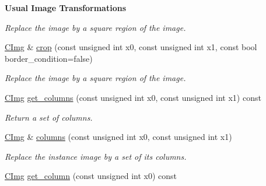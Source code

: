 \begin{Indent}{\bf Usual Image Transformations}
\begin{DoxyCompactItemize}
\begin{DoxyCompactList}\small\item\em Replace the image by a square region of the image. \item\end{DoxyCompactList}\item 
\hyperlink{structcimg__library_1_1_c_img}{CImg} \& \hyperlink{structcimg__library_1_1_c_img_abd2a8955ef0e22628759ce9c55469a93}{crop} (const unsigned int x0, const unsigned int x1, const bool border\_\-condition=false)
\begin{DoxyCompactList}\small\item\em Replace the image by a square region of the image. \item\end{DoxyCompactList}\item 
\hypertarget{structcimg__library_1_1_c_img_a630db2b45e12cecc5074abcd5af08a6a}{
\hyperlink{structcimg__library_1_1_c_img}{CImg} \hyperlink{structcimg__library_1_1_c_img_a630db2b45e12cecc5074abcd5af08a6a}{get\_\-columns} (const unsigned int x0, const unsigned int x1) const }
\label{structcimg__library_1_1_c_img_a630db2b45e12cecc5074abcd5af08a6a}

\begin{DoxyCompactList}\small\item\em Return a set of columns. \item\end{DoxyCompactList}\item 
\hypertarget{structcimg__library_1_1_c_img_a8eccc5addf3a52ead3d21dfa44193e06}{
\hyperlink{structcimg__library_1_1_c_img}{CImg} \& \hyperlink{structcimg__library_1_1_c_img_a8eccc5addf3a52ead3d21dfa44193e06}{columns} (const unsigned int x0, const unsigned int x1)}
\label{structcimg__library_1_1_c_img_a8eccc5addf3a52ead3d21dfa44193e06}

\begin{DoxyCompactList}\small\item\em Replace the instance image by a set of its columns. \item\end{DoxyCompactList}\item 
\hypertarget{structcimg__library_1_1_c_img_a935b82fb5ca9df5f120954480c83d75f}{
\hyperlink{structcimg__library_1_1_c_img}{CImg} \hyperlink{structcimg__library_1_1_c_img_a935b82fb5ca9df5f120954480c83d75f}{get\_\-column} (const unsigned int x0) const }
\label{structcimg__library_1_1_c_img_a935b82fb5ca9df5f120954480c83d75f}


\end{DoxyCompactItemize}
\end{Indent}
